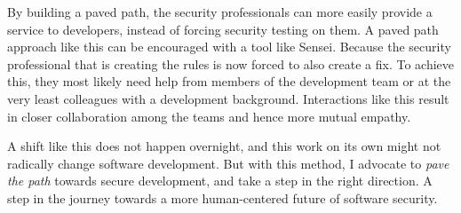 By building a paved path, the security professionals can more easily provide a service to developers, instead of forcing security testing on them.
A paved path approach like this can be encouraged with a tool like Sensei.
Because the security professional that is creating the rules is now forced to also create a fix.
To achieve this, they most likely need help from members of the development team or at the very least colleagues with a development background.
Interactions like this result in closer collaboration among the teams and hence more mutual empathy.

A shift like this does not happen overnight, and this work on its own might not radically change software development.
But with this method, I advocate to \textit{pave the path} towards secure development, and take a step in the right direction.
A step in the journey towards a more human-centered future of software security.